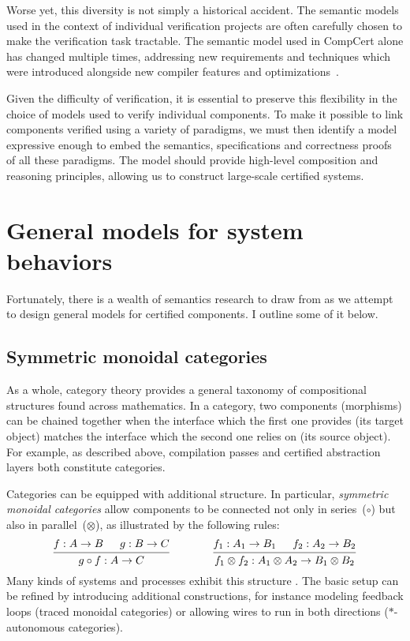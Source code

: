 \documentclass[11pt,oneside]{book}
\theoremstyle{definition}
\begin{document}
Worse yet,
this diversity is not simply a historical accident.
The semantic models
used in the context of individual verification projects
are often carefully chosen
to make the verification task tractable.
The semantic model used in CompCert alone
has changed multiple times,
addressing new requirements and techniques
which were introduced alongside
new compiler features and optimizations~\citep{compsem}.

Given the difficulty of verification,
it is essential
to preserve this flexibility in the choice of models
used to verify individual components.
To make it possible to link components
verified using a variety of paradigms,
we must then identify a model
expressive enough to embed
the semantics, specifications and correctness proofs
of all these paradigms.
The model should provide
high-level composition and reasoning principles,
allowing us to construct large-scale certified systems.



\section{General models for system behaviors} %
\label{ssec:genmodel}

Fortunately,
there is a wealth of semantics research to draw from
as we attempt to design general models for certified components.
I outline some of it below.

\subsection{Symmetric monoidal categories} %

As a whole,
category theory provides
a general taxonomy of
compositional structures found
across mathematics.
In a category,
two components (morphisms) can be chained together when
the interface which the first one provides
(its target object)
matches the interface which the second one relies on
(its source object).
For example,
as described above,
compilation passes and certified abstraction layers
both constitute categories.

Categories can be equipped with additional structure.
In particular,
\emph{symmetric monoidal categories}
allow components to be connected
not only in series~($\circ$)
but also in parallel~($\otimes$),
as illustrated by the following rules:
\[
  \begin{prooftree}
    \hypo{f : A \rightarrow B}
    \hypo{g : B \rightarrow C}
    \infer2{g \circ f : A \rightarrow C}
  \end{prooftree}
  \qquad
  \qquad
  \begin{prooftree}
    \hypo{f_1 : A_1 \rightarrow B_1}
    \hypo{f_2 : A_2 \rightarrow B_2}
    \infer2{f_1 \otimes f_2 : A_1 \otimes A_2 \rightarrow B_1 \otimes B_2}
  \end{prooftree}
\]
Many kinds of systems and processes
exhibit this structure \citep{rosetta}.
The basic setup can be refined by introducing additional constructions,
for instance modeling
feedback loops (traced monoidal categories) or allowing
wires to run in both directions
($*$-autonomous categories).
\end{document}

